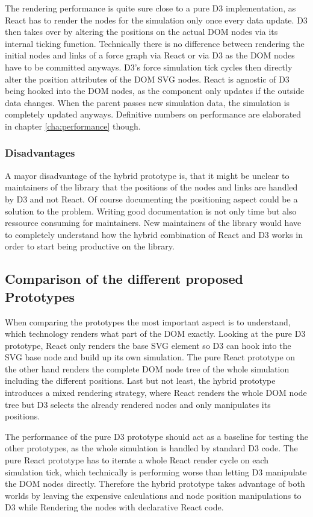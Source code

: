 The rendering performance is quite sure close to a pure D3 implementation, as React has to render the nodes for the simulation only once every data update. D3 then takes over by altering the positions on the actual DOM nodes via its internal ticking function. Technically there is no difference between rendering the initial nodes and links of a force graph via React or via D3 as the DOM nodes have to be committed anyways. D3's force simulation tick cycles then directly alter the position attributes of the DOM SVG nodes. React is agnostic of D3 being hooked into the DOM nodes, as the component only updates if the outside data changes. When the parent passes new simulation data, the simulation is completely updated anyways. Definitive numbers on performance are elaborated in chapter \ref{cha:performance} though.

\subsubsection{Disadvantages}

A mayor disadvantage of the hybrid prototype is, that it might be unclear to maintainers of the library that the positions of the nodes and links are handled by D3 and not React. Of course documenting the positioning aspect could be a solution to the problem. Writing good documentation is not only time but also ressource consuming for maintainers. New maintainers of the library would have to completely understand how the hybrid combination of React and D3 works in order to start being productive on the library.

\subsection{Comparison of the different proposed Prototypes}

When comparing the prototypes the most important aspect is to understand, which technology renders what part of the DOM exactly. Looking at the pure D3 prototype, React only renders the base SVG element so D3 can hook into the SVG base node and build up its own simulation. The pure React prototype on the other hand renders the complete DOM node tree of the whole simulation including the different positions. Last but not least, the hybrid prototype introduces a mixed rendering strategy, where React renders the whole DOM node tree but D3 selects the already rendered nodes and only manipulates its positions.

The performance of the pure D3 prototype should act as a baseline for testing the other prototypes, as the whole simulation is handled by standard D3 code. The pure React prototype has to iterate a whole React render cycle on each simulation tick, which technically is performing worse than letting D3 manipulate the DOM nodes directly. Therefore the hybrid prototype takes advantage of both worlds by leaving the expensive calculations and node position manipulations to D3 while Rendering the nodes with declarative React code.

